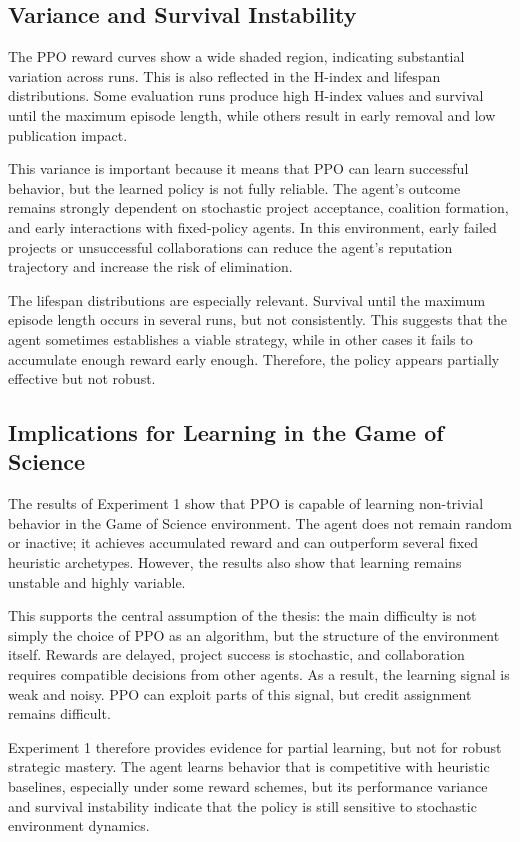 \documentclass[english,bachelor]{hsluthesis}
\begin{document}
\subsection{Variance and Survival Instability}

The PPO reward curves show a wide shaded region, indicating substantial variation across runs. This is also reflected in the H-index and lifespan distributions. Some evaluation runs produce high H-index values and survival until the maximum episode length, while others result in early removal and low publication impact.

This variance is important because it means that PPO can learn successful behavior, but the learned policy is not fully reliable. The agent's outcome remains strongly dependent on stochastic project acceptance, coalition formation, and early interactions with fixed-policy agents. In this environment, early failed projects or unsuccessful collaborations can reduce the agent's reputation trajectory and increase the risk of elimination.

The lifespan distributions are especially relevant. Survival until the maximum episode length occurs in several runs, but not consistently. This suggests that the agent sometimes establishes a viable strategy, while in other cases it fails to accumulate enough reward early enough. Therefore, the policy appears partially effective but not robust.

\subsection{Implications for Learning in the Game of Science}

The results of Experiment 1 show that PPO is capable of learning non-trivial behavior in the Game of Science environment. The agent does not remain random or inactive; it achieves accumulated reward and can outperform several fixed heuristic archetypes. However, the results also show that learning remains unstable and highly variable.

This supports the central assumption of the thesis: the main difficulty is not simply the choice of PPO as an algorithm, but the structure of the environment itself. Rewards are delayed, project success is stochastic, and collaboration requires compatible decisions from other agents. As a result, the learning signal is weak and noisy. PPO can exploit parts of this signal, but credit assignment remains difficult.

Experiment 1 therefore provides evidence for partial learning, but not for robust strategic mastery. The agent learns behavior that is competitive with heuristic baselines, especially under some reward schemes, but its performance variance and survival instability indicate that the policy is still sensitive to stochastic environment dynamics.
\end{document}
